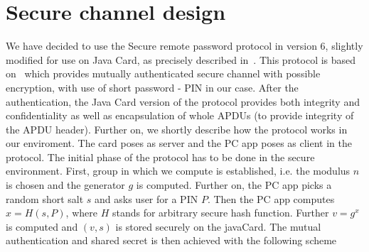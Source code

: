 \documentclass[12pt,a4paper]{article}
\begin{document}
\section*{Secure channel design}
We have decided to use the Secure remote password protocol in version 6, slightly modified for use on Java Card, as precisely described in~\cite{srpjava}. This protocol is based on~\cite{srp} which provides mutually authenticated secure channel with possible encryption, with use of short password - PIN in our case. After the authentication, the Java Card version of the protocol provides both integrity and confidentiality as well as encapsulation of whole APDUs (to provide integrity of the APDU header). Further on, we shortly describe how the protocol works in our enviroment. The card poses as server and the PC app poses as client in the protocol. The initial phase of the protocol has to be done in the secure environment. First, group in which we compute is established, i.e. the modulus $n$ is chosen and the generator $g$ is computed. Further on, the PC app picks a random short salt $s$ and asks user for a PIN $P$. Then the PC app computes $x = H(s,P)$, where $H$ stands for arbitrary secure hash function. Further $v = g^x$ is computed and $(v,s)$ is stored securely on the javaCard. The mutual authentication and shared secret is then achieved with the following scheme
\end{document}
